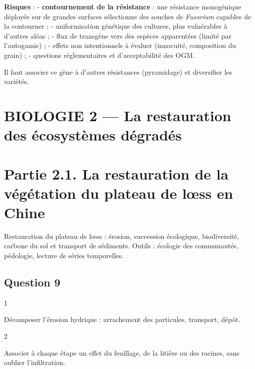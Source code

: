 \documentclass[11pt,a4paper]{article}
\begin{document}
\textbf{Risques} :
- \textbf{contournement de la résistance} : une résistance monogénique déployée sur de grandes surfaces sélectionne des souches de \emph{Fusarium} capables de la contourner ;
- uniformisation génétique des cultures, plus vulnérables à d'autres aléas ;
- flux de transgène vers des espèces apparentées (limité par l'autogamie) ;
- effets non intentionnels à évaluer (innocuité, composition du grain) ;
- questions réglementaires et d'acceptabilité des OGM.

Il faut associer ce gène à d'autres résistances (pyramidage) et diversifier les variétés.

\hypertarget{biologie-2-la-restauration-des-uxe9cosystuxe8mes-duxe9graduxe9s}{%
\section{BIOLOGIE 2 --- La restauration des écosystèmes dégradés}\label{biologie-2-la-restauration-des-uxe9cosystuxe8mes-duxe9graduxe9s}}

\hypertarget{partie-2.1.-la-restauration-de-la-vuxe9guxe9tation-du-plateau-de-lux153ss-en-chine}{%
\section{Partie 2.1. La restauration de la végétation du plateau de lœss en Chine}\label{partie-2.1.-la-restauration-de-la-vuxe9guxe9tation-du-plateau-de-lux153ss-en-chine}}

Restauration du plateau de lœss : érosion, succession écologique, biodiversité, carbone du sol et transport de sédiments. Outils : écologie des communautés, pédologie, lecture de séries temporelles.

\hypertarget{question-9}{%
\subsection{Question 9}\label{question-9}}

\begin{indication}{1}

Décomposer l'érosion hydrique : arrachement des particules, transport, dépôt.

\end{indication}

\begin{indication}{2}

Associer à chaque étape un effet du feuillage, de la litière ou des racines, sans oublier l'infiltration.

\end{indication}
\end{document}

